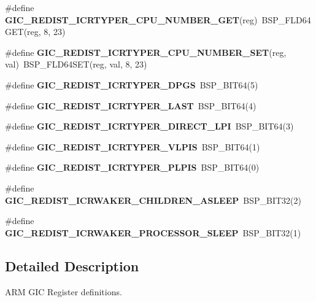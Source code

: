 \begin{DoxyCompactItemize}
\item 
\mbox{\label{arm-gic-regs_8h_aa211cf020d87622d0a27c55a26ff3d0a}} 
\#define {\bfseries G\+I\+C\+\_\+\+R\+E\+D\+I\+S\+T\+\_\+\+I\+C\+R\+T\+Y\+P\+E\+R\+\_\+\+C\+P\+U\+\_\+\+N\+U\+M\+B\+E\+R\+\_\+\+G\+ET}(reg)~B\+S\+P\+\_\+\+F\+L\+D64\+G\+ET(reg, 8, 23)
\item 
\mbox{\label{arm-gic-regs_8h_a14440d7cf603d9dfab48faa46649710f}} 
\#define {\bfseries G\+I\+C\+\_\+\+R\+E\+D\+I\+S\+T\+\_\+\+I\+C\+R\+T\+Y\+P\+E\+R\+\_\+\+C\+P\+U\+\_\+\+N\+U\+M\+B\+E\+R\+\_\+\+S\+ET}(reg,  val)~B\+S\+P\+\_\+\+F\+L\+D64\+S\+ET(reg, val, 8, 23)
\item 
\mbox{\label{arm-gic-regs_8h_aefe872545c1f1688a022c2a3de043280}} 
\#define {\bfseries G\+I\+C\+\_\+\+R\+E\+D\+I\+S\+T\+\_\+\+I\+C\+R\+T\+Y\+P\+E\+R\+\_\+\+D\+P\+GS}~B\+S\+P\+\_\+\+B\+I\+T64(5)
\item 
\mbox{\label{arm-gic-regs_8h_a39beddff6619fd68565fac65b8464716}} 
\#define {\bfseries G\+I\+C\+\_\+\+R\+E\+D\+I\+S\+T\+\_\+\+I\+C\+R\+T\+Y\+P\+E\+R\+\_\+\+L\+A\+ST}~B\+S\+P\+\_\+\+B\+I\+T64(4)
\item 
\mbox{\label{arm-gic-regs_8h_a2572b2c15d737cf1044292a444e0333f}} 
\#define {\bfseries G\+I\+C\+\_\+\+R\+E\+D\+I\+S\+T\+\_\+\+I\+C\+R\+T\+Y\+P\+E\+R\+\_\+\+D\+I\+R\+E\+C\+T\+\_\+\+L\+PI}~B\+S\+P\+\_\+\+B\+I\+T64(3)
\item 
\mbox{\label{arm-gic-regs_8h_aaddedac4601f9ab890656b8528647453}} 
\#define {\bfseries G\+I\+C\+\_\+\+R\+E\+D\+I\+S\+T\+\_\+\+I\+C\+R\+T\+Y\+P\+E\+R\+\_\+\+V\+L\+P\+IS}~B\+S\+P\+\_\+\+B\+I\+T64(1)
\item 
\mbox{\label{arm-gic-regs_8h_a77abd9516c043756d0741a4272d0eb0d}} 
\#define {\bfseries G\+I\+C\+\_\+\+R\+E\+D\+I\+S\+T\+\_\+\+I\+C\+R\+T\+Y\+P\+E\+R\+\_\+\+P\+L\+P\+IS}~B\+S\+P\+\_\+\+B\+I\+T64(0)
\item 
\mbox{\label{arm-gic-regs_8h_af2365a3797fc9cb04b3b99e2fc7a3143}} 
\#define {\bfseries G\+I\+C\+\_\+\+R\+E\+D\+I\+S\+T\+\_\+\+I\+C\+R\+W\+A\+K\+E\+R\+\_\+\+C\+H\+I\+L\+D\+R\+E\+N\+\_\+\+A\+S\+L\+E\+EP}~B\+S\+P\+\_\+\+B\+I\+T32(2)
\item 
\mbox{\label{arm-gic-regs_8h_a2398358584bc7e019cc2d0c64360b320}} 
\#define {\bfseries G\+I\+C\+\_\+\+R\+E\+D\+I\+S\+T\+\_\+\+I\+C\+R\+W\+A\+K\+E\+R\+\_\+\+P\+R\+O\+C\+E\+S\+S\+O\+R\+\_\+\+S\+L\+E\+EP}~B\+S\+P\+\_\+\+B\+I\+T32(1)
\end{DoxyCompactItemize}


\subsection{Detailed Description}
A\+RM G\+IC Register definitions. 

